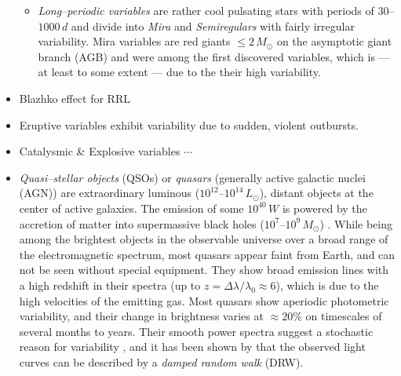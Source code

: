 \begin{itemize}
\begin{itemize}[label=$\circ$]
	\item \emph{Long--periodic variables} are rather cool pulsating stars with periods of $30$--$1000 \, \unit{d}$ and divide into \emph{Mira} and \emph{Semiregulars} with fairly irregular variability. Mira variables are red giants $\le 2 \, \unit{M_\odot}$ on the asymptotic giant branch (AGB) \citep{unsoeld2001} and were among the first discovered variables, which is --- at least to some extent --- due to the their high variability.
	\end{itemize}

\item{Blazhko effect for RRL}
\item Eruptive variables exhibit variability due to sudden, violent outbursts.
\item Catalysmic \& Explosive variables $\cdots$


\item \emph{Quasi--stellar objects} (QSOs) or \emph{quasars} (generally active galactic nuclei (AGN)) are extraordinary luminous ($10^{12}$--$10^{14} \, \unit{L_\odot}$), distant objects at the center of active galaxies. The emission of some $10^{40} \, \unit{W}$ is powered by the accretion of matter into supermassive black holes ($10^7$--$10^9 \, \unit{M_\odot}$) \citep{hanslmeier2007}. While being among the brightest objects in the observable universe over a broad range of the electromagnetic spectrum, most quasars appear faint from Earth, and can not be seen without special equipment. They show broad emission lines with a high redshift in their spectra (up to $z  = \Delta \lambda / \lambda_0 \approx 6$), which is due to the high velocities of the emitting gas. Most quasars show aperiodic photometric variability, and their change in brightness varies at $\approx 20\%$ on timescales of several months to years. Their smooth power spectra suggest a stochastic reason for variability \citep{macleod2010}, and it has been shown by \citet{kozlowski2010} that the observed light curves can be described by a \emph{damped random walk} (DRW).


\end{itemize}

